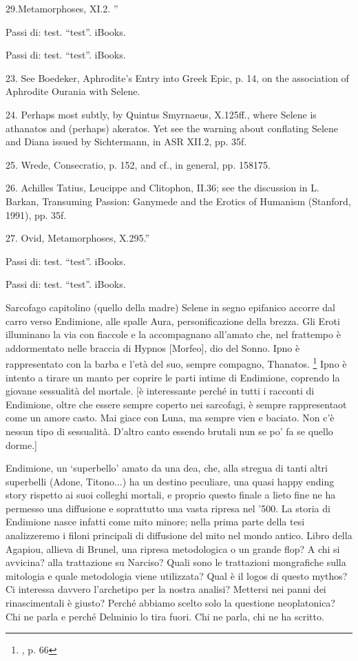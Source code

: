 \documentclass[12pt,a4paper,openright, oneside]{book}
\begin{document}
29.Metamorphoses, XI.2.	
		”

Passi di: test. “test”. iBooks. 

Passi di: test. “test”. iBooks. 
		
23. See Boedeker, Aphrodite's Entry into Greek Epic, p. 14, on the association of Aphrodite Ourania with Selene.	
		
24. Perhaps most subtly, by Quintus Smyrnaeus, X.125ff., where Selene is athanatos and (perhaps) akeratos. Yet see the warning about conflating Selene and Diana issued by Sichtermann, in ASR XII.2, pp. 35f.	
		
25. Wrede, Consecratio, p. 152, and cf., in general, pp. 158175.	
		
26. Achilles Tatius, Leucippe and Clitophon, II.36; see the discussion in L. Barkan, Transuming Passion: Ganymede and the Erotics of Humanism (Stanford, 1991), pp. 35f.	
		
27. Ovid, Metamorphoses, X.295.”

Passi di: test. “test”. iBooks. 

Passi di: test. “test”. iBooks. 

Sarcofago capitolino (quello della madre) 
Selene in segno epifanico accorre dal carro verso Endimione, alle spalle Aura, personificazione della brezza. Gli Eroti illuminano la via con fiaccole e la accompagnano all'amato che, nel frattempo è addormentato nelle braccia di Hypnos [Morfeo], dio del Sonno. Ipno è rappresentato con la barba e l'età del suo, sempre compagno, Thanatos. \footnote{\cite{Koorbojian}, p. 66} Ipno è intento a tirare un manto per coprire le parti intime di Endimione, coprendo la giovane sessualità del mortale. [è interessante perché in tutti i racconti di Endimione, oltre che essere sempre coperto nei sarcofagi, è sempre rappresentaot come un amore casto. Mai giace con Luna, ma sempre vien e baciato. Non c'è nessun tipo di sessualità. D'altro canto essendo brutali nun se po' fa se quello dorme.]


 Endimione, un `superbello' amato da una dea, che, alla stregua di tanti altri superbelli (Adone, Titono...) ha un destino peculiare, una quasi happy ending story rispetto ai suoi colleghi mortali, e proprio questo finale a lieto fine ne ha permesso una diffusione e soprattutto una vasta ripresa nel '500. La storia di Endimione nasce infatti come mito minore; nella prima parte della tesi analizzeremo i filoni principali di diffusione del mito nel mondo antico.
Libro della Agapiou, allieva di Brunel, una ripresa metodologica o un grande flop?
A chi si avvicina? alla trattazione su Narciso?
Quali sono le trattazioni mongrafiche sulla mitologia e quale metodologia viene utilizzata?
Qual è il logos di questo mythos?
Ci interessa davvero l'archetipo per la nostra analisi? Mettersi nei panni dei rinascimentali è giusto? Perché abbiamo scelto solo la questione neoplatonica? Chi ne parla e perché Delminio lo tira fuori.
Chi ne parla, chi ne ha scritto.
\end{document}
